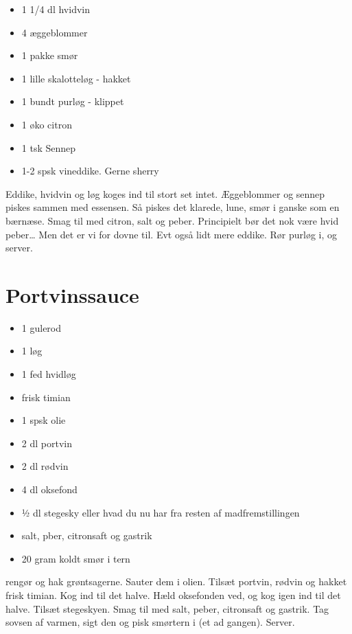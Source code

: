 \documentclass[
]{book}
\providecommand{\tightlist}{%
  \setlength{\itemsep}{0pt}\setlength{\parskip}{0pt}}
\begin{document}
\begin{itemize}
\tightlist
\item
  1 1/4 dl hvidvin
\item
  4 æggeblommer
\item
  1 pakke smør
\item
  1 lille skalotteløg - hakket
\item
  1 bundt purløg - klippet
\item
  1 øko citron
\item
  1 tsk Sennep
\item
  1-2 spsk vineddike. Gerne sherry
\end{itemize}

Eddike, hvidvin og løg koges ind til stort set intet.
Æggeblommer og sennep piskes sammen med essensen. Så piskes det klarede,
lune, smør i ganske som en bærnæse. Smag til med citron, salt og peber.
Principielt bør det nok være hvid peber\ldots{} Men det er vi for dovne til.
Evt også lidt mere eddike.
Rør purløg i, og server.

\hypertarget{portvinssauce}{%
\section{Portvinssauce}\label{portvinssauce}}

\begin{itemize}
\tightlist
\item
  1 gulerod
\item
  1 løg
\item
  1 fed hvidløg
\item
  frisk timian
\item
  1 spsk olie
\item
  2 dl portvin
\item
  2 dl rødvin
\item
  4 dl oksefond
\item
  ½ dl stegesky eller hvad du nu har fra resten af madfremstillingen
\item
  salt, pber, citronsaft og gastrik
\item
  20 gram koldt smør i tern
\end{itemize}

rengør og hak grøntsagerne.
Sauter dem i olien.
Tilsæt portvin, rødvin og hakket frisk timian. Kog ind til det halve.
Hæld oksefonden ved, og kog igen ind til det halve. Tilsæt stegeskyen.
Smag til med salt, peber, citronsaft og gastrik.
Tag sovsen af varmen, sigt den og pisk smørtern i (et ad gangen). Server.
\end{document}
